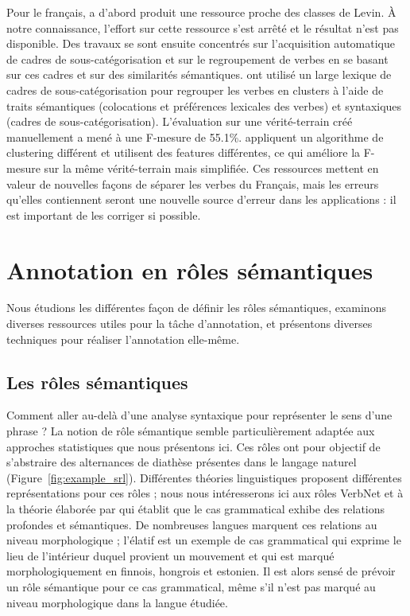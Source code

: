 Pour le français, \cite{saintdizier1996constructing} a d'abord produit une
ressource proche des classes de Levin. À notre connaissance, l'effort sur cette
ressource s'est arrêté et le résultat n'est pas disponible. Des travaux se sont
ensuite concentrés sur l'acquisition automatique de cadres de
sous-catégorisation et sur le regroupement de verbes en se basant sur ces
cadres et sur des similarités sémantiques. \cite{sun2010investigating} ont
utilisé un large lexique de cadres de sous-catégorisation
\citep{messiant2010acquisition} pour regrouper les verbes en clusters à l'aide
de traits sémantiques (colocations et préférences lexicales des verbes) et
syntaxiques (cadres de sous-catégorisation). L'évaluation sur une
vérité-terrain créé manuellement a mené à une F-mesure de 55.1\%.
\cite{falk2012classifying} appliquent un algorithme de clustering différent et
utilisent des features différentes, ce qui améliore la F-mesure sur la même
vérité-terrain mais simplifiée. Ces ressources mettent en valeur de nouvelles
façons de séparer les verbes du Français, mais les erreurs qu'elles contiennent
seront une nouvelle source d'erreur dans les applications : il est important de
les corriger si possible.


\section{Annotation en rôles sémantiques}
\label{sec:srl}

Nous étudions les différentes façon de définir les rôles sémantiques, examinons
diverses ressources utiles pour la tâche d'annotation, et présentons diverses
techniques pour réaliser l'annotation elle-même.

\subsection{Les rôles sémantiques}
\label{subsec:roles_semantiques}

Comment aller au-delà d'une analyse syntaxique pour représenter le sens d'une
phrase ? La notion de rôle sémantique semble particulièrement adaptée aux
approches statistiques que nous présentons ici. Ces rôles ont pour objectif de
s'abstraire des alternances de diathèse présentes dans le langage naturel
(Figure~\ref{fig:example_srl}). Différentes théories linguistiques proposent
différentes représentations pour ces rôles ; nous nous intéresserons ici aux
rôles VerbNet et à la théorie élaborée par \cite{fillmore1968case} qui établit
que le cas grammatical exhibe des relations profondes et sémantiques. De
nombreuses langues marquent ces relations au niveau morphologique ; l'élatif
est un exemple de cas grammatical qui exprime le lieu de l'intérieur duquel
provient un mouvement et qui est marqué morphologiquement en finnois, hongrois
et estonien. Il est alors sensé de prévoir un rôle sémantique pour ce cas
grammatical, même s'il n'est pas marqué au niveau morphologique dans la langue
étudiée.

